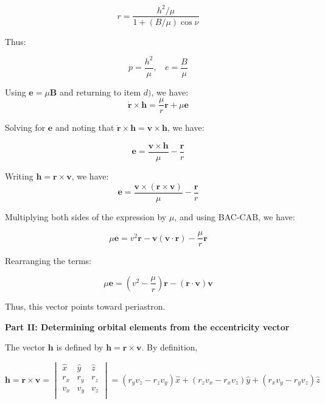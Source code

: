 \documentclass[11pt]{article}
\begin{document}
\begin{pproblem}
\begin{pssolution*}{}{}
\begin{alternativas}
            \[r = \frac{h^2/\mu}{1+(B/\mu)\cos\nu}\]

            Thus:

            \[\boxed{p = \frac{h^2}{\mu}, \ \ \ \ e = \frac{B}{\mu}}\]

            \item Using \(\mathbf{e} = \mu \mathbf{B}\) and returning to item \(d)\), we have:
            \[\dot{\mathbf{r}}\times \mathbf{h} = \frac{\mu}{r}\mathbf{r}+\mu \mathbf{e}\]

            Solving for \(\mathbf{e}\) and noting that \(\dot{\mathbf{r}}\times\mathbf{h} = \mathbf{v}\times\mathbf{h}\), we have:

            \[\boxed{\mathbf{e} = \frac{\mathbf{v}\times\mathbf{h}}{\mu} - \frac{\mathbf{r}}{r}}\]

            \item Writing \(\mathbf{h} = \mathbf{r}\times\mathbf{v}\), we have:
            \[\mathbf{e} = \frac{\mathbf{v}\times(\mathbf{r}\times\mathbf{v})}{\mu} - \frac{\mathbf{r}}{r} \]

            Multiplying both sides of the expression by \(\mu\), and using BAC-CAB, we have:

            \[\mu\mathbf{e} = v^2\mathbf{r} - \mathbf{v}(\mathbf{v}\cdot\mathbf{r}) - \frac{\mu}{r}\mathbf{r}\]

            Rearranging the terms:

            \[\boxed{\mu \mathbf{e} = (v^2-\frac{\mu}{r})\mathbf{r} - (\mathbf{r}\cdot\mathbf{v})\mathbf{v}}\]

            Thus, this vector points toward periastron.
        \end{alternativas}
        \begin{center}
            \textbf{Part II: Determining orbital elements from the eccentricity vector}     
        \end{center}
        \begin{alternativas}
            \item The vector $\mathbf{h}$ is defined by $\mathbf{h} = \mathbf{r}\times\mathbf{v}$. By definition,
            
            $$\mathbf{h}=\mathbf{r}\times\mathbf{v} = 
            \begin{vmatrix}
                \hat{x} & \hat{y} & \hat{z} \\
                r_x & r_y & r_z \\
                v_x & v_y & v_z \\
            \end{vmatrix}
            = (r_yv_z - r_zv_y)\hat{x} + (r_zv_x-r_xv_z)\hat{y} + (r_xv_y-r_yv_z)\hat{z}   $$


\end{alternativas}
\end{pssolution*}
\end{pproblem}
\end{document}

